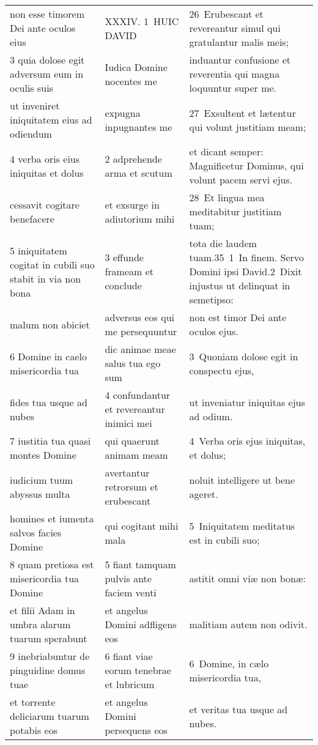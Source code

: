 \documentclass{article}
\begin{document}
\begin{longtable}{@{}p{}p{}p{}@{}}
non esse timorem Dei ante oculos eius	&	XXXIV. 1 HUIC DAVID	&	26 Erubescant et revereantur simul qui gratulantur malis meis;	\\
3 quia dolose egit adversum eum in oculis suis	&	Iudica Domine nocentes me	&	induantur confusione et reverentia qui magna loquuntur super me.	\\
ut inveniret iniquitatem eius ad odiendum	&	expugna inpugnantes me	&	27 Exsultent et lætentur qui volunt justitiam meam;	\\
4 verba oris eius iniquitas et dolus	&	2 adprehende arma et scutum	&	et dicant semper: Magnificetur Dominus, qui volunt pacem servi ejus.	\\
cessavit cogitare benefacere	&	et exsurge in adiutorium mihi	&	28 Et lingua mea meditabitur justitiam tuam;	\\
5 iniquitatem cogitat in cubili suo stabit in via non bona	&	3 effunde frameam et conclude	&	tota die laudem tuam.35 1 In finem. Servo Domini ipsi David.2 Dixit injustus ut delinquat in semetipso:	\\
malum non abiciet	&	adversus eos qui me persequuntur	&	non est timor Dei ante oculos ejus.	\\
6 Domine in caelo misericordia tua	&	dic animae meae salus tua ego sum	&	3 Quoniam dolose egit in conspectu ejus,	\\
fides tua usque ad nubes	&	4 confundantur et revereantur inimici mei	&	ut inveniatur iniquitas ejus ad odium.	\\
7 iustitia tua quasi montes Domine	&	qui quaerunt animam meam	&	4 Verba oris ejus iniquitas, et dolus;	\\
iudicium tuum abyssus multa	&	avertantur retrorsum et erubescant	&	noluit intelligere ut bene ageret.	\\
homines et iumenta salvos facies Domine	&	qui cogitant mihi mala	&	5 Iniquitatem meditatus est in cubili suo;	\\
8 quam pretiosa est misericordia tua Domine	&	5 fiant tamquam pulvis ante faciem venti	&	astitit omni viæ non bonæ:	\\
et filii Adam in umbra alarum tuarum sperabunt	&	et angelus Domini adfligens eos	&	malitiam autem non odivit.	\\
9 inebriabuntur de pinguidine domus tuae	&	6 fiant viae eorum tenebrae et lubricum	&	6 Domine, in cælo misericordia tua,	\\
et torrente deliciarum tuarum potabis eos	&	et angelus Domini persequens eos	&	et veritas tua usque ad nubes.	\\

\end{longtable}
\end{document}
